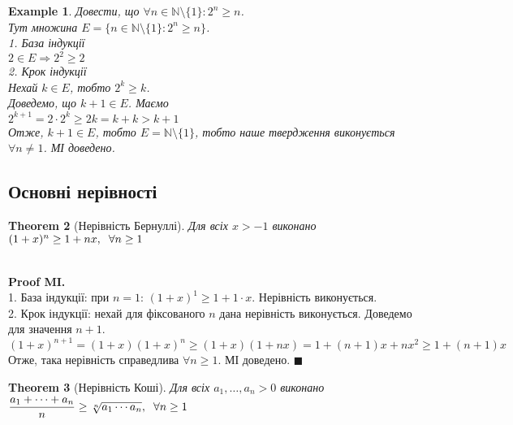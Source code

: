 \documentclass[a4paper, 14pt]{article}
\theoremstyle{theoremdd}
\newtheorem{theorem}{Theorem}[subsection]
\theoremstyle{theoremdd}
\theoremstyle{theoremdd}
\theoremstyle{theoremdd}
\newtheorem{example}[theorem]{Example}
\theoremstyle{theoremdd}
\theoremstyle{theoremdd}
\theoremstyle{theoremdd}
\theoremstyle{theoremdd}
\newenvironment{pfMI}{\vspace*{-3mm} \textbf{\\ Proof MI. \\}}{\hfill $\blacksquare$}
\begin{document}
	\begin{example}
	Довести, що $\forall n \in \mathbb{N} \setminus \{1\}: 2^n \geq n$.\\
	Тут множина $E = \{n \in \mathbb{N} \setminus \{1\}: 2^n \geq n \}$.\\
	1. База індукції\\
	$2 \in E \Rightarrow 2^2 \geq 2$
	\bigskip \\
	2. Крок індукції\\
	Нехай $k \in E$, тобто $2^k \geq k$.\\
	Доведемо, що $k+1 \in E$. Маємо\\
	$2^{k+1} = 2 \cdot 2^k \geq 2k = k + k > k+1$\\
	Отже, $k+1 \in E$, тобто $E = \mathbb{N} \setminus \{1\}$, тобто наше твердження виконується $\forall n \neq 1$. МІ доведено.
	\end{example}
	
	\subsection*{Основні нерівності}
	\begin{theorem}[Нерівність Бернуллі]
	Для всіх $x > -1$ виконано $(1+x)^n \geq 1+nx, \hspace{0.2cm} \forall n \geq 1$
	\end{theorem}
	
	\begin{pfMI}
	1. База індукції: при $n=1$: $(1+x)^1 \geq 1+1\cdot x$. Нерівність виконується.\\
	2. Крок індукції: нехай для фіксованого $n$ дана нерівність виконується. Доведемо для значення $n+1$.\\
	$(1+x)^{n+1}=(1+x)(1+x)^n \geq (1+x)(1+nx)=1+(n+1)x+nx^2 \geq 1+(n+1)x$\\
	Отже, така нерівність справедлива $\forall n \geq 1$. МІ доведено.
	\end{pfMI}
	
	\begin{theorem}[Нерівність Коші]
	Для всіх $a_1,\dots,a_n > 0$ виконано
	$\dfrac{a_1+\cdots+a_n}{n} \geq \sqrt[n]{a_1 \cdots a_n}, \hspace{0.2cm} \forall n \geq 1$
	\end{theorem}
	
\end{document}
